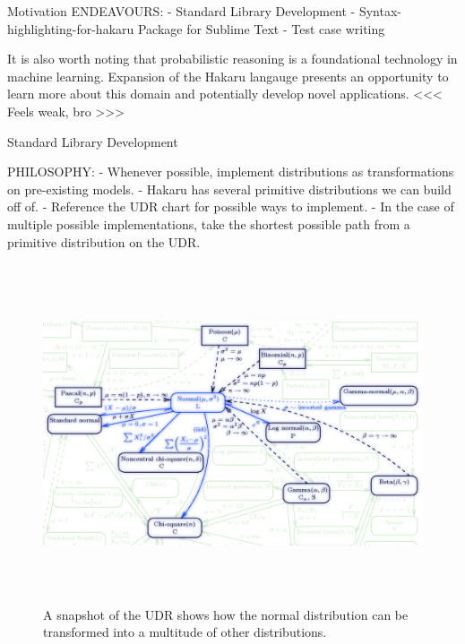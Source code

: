 \documentclass[22pt]{beamer}
\begin{document}
\begin{frame}[fragile]
\begin{textblock}{5}
\begin{textblock}{5}
\begin{block}{Motivation}
\tiny{ENDEAVOURS:
        - Standard Library Development
        - Syntax-highlighting-for-hakaru Package for Sublime Text
        - Test case writing}

\bigskip

\tiny{It is also worth noting that probabilistic reasoning is a foundational technology in machine learning. Expansion of the Hakaru langauge presents an opportunity to learn more about this domain and potentially develop novel applications.} <<< Feels weak, bro >>>

\end{block}


\begin{block}{Standard Library Development}
\justifying

\tiny{ PHILOSOPHY:
        - Whenever possible, implement distributions as transformations on pre-existing models.
        - Hakaru has several primitive distributions we can build off of.
        - Reference the UDR chart for possible ways to implement.
        - In the case of multiple possible implementations, take the shortest possible path from a primitive distribution on the UDR.}

\bigskip

\begin{figure}
\centering
\includegraphics[height=10cm]{UDR.png}
\caption{\tiny{A snapshot of the UDR shows how the normal distribution can be transformed into a multitude of other distributions.}}
\end{figure}


\end{block}
\end{textblock}
\end{textblock}
\end{frame}
\end{document}

